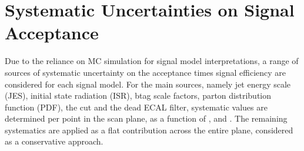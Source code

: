 
\section{Systematic Uncertainties on Signal Acceptance }  %
\label{sec:interpretation_uncertainties}

Due to the reliance on MC simulation for signal model interpretations, a range
of sources of systematic uncertainty on the acceptance times signal efficiency
are considered for each signal 
model. For the main sources, namely jet energy scale (JES), initial state 
radiation (ISR), btag scale factors, parton distribution function (PDF), the 
\mhtmet cut and the dead ECAL filter, systematic values are determined per point
in the scan plane, as a function of \HT, \nb and \nj. The remaining systematics 
are applied as a flat contribution across the entire plane, considered as a 
conservative approach.

